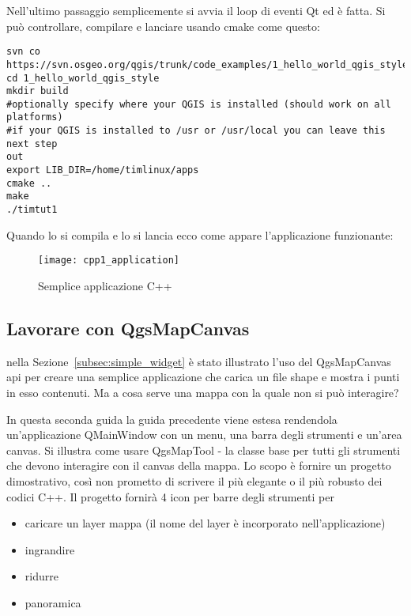 Nell'ultimo passaggio semplicemente si avvia il loop di eventi Qt ed è fatta. Si può controllare, compilare e lanciare usando cmake come questo:

\begin{verbatim}
svn co
https://svn.osgeo.org/qgis/trunk/code_examples/1_hello_world_qgis_style
cd 1_hello_world_qgis_style
mkdir build
#optionally specify where your QGIS is installed (should work on all
platforms)
#if your QGIS is installed to /usr or /usr/local you can leave this next step
out
export LIB_DIR=/home/timlinux/apps
cmake ..
make
./timtut1
\end{verbatim}

Quando lo si compila e lo si lancia ecco come appare l'applicazione funzionante:

\begin{figure}[ht]
   \begin{center}
   \caption{Semplice applicazione C++ \osxcaption}\label{fig:cpp1_application}\smallskip
   \texttt{[image: cpp1\_application]}
\end{center}
\end{figure}

\subsection{Lavorare con QgsMapCanvas}

nella Sezione~\ref{subsec:simple_widget} è stato illustrato l'uso del QgsMapCanvas api per creare una semplice applicazione che carica un file shape e mostra i punti in esso contenuti. Ma a cosa serve una mappa con la quale non si può interagire?

In questa seconda guida la guida precedente viene estesa rendendola un'applicazione QMainWindow con un menu, una barra degli strumenti e un'area canvas. Si illustra come usare QgsMapTool - la classe base per tutti gli strumenti che devono interagire con il canvas della mappa.
Lo scopo è fornire un progetto dimostrativo, così non prometto di scrivere il più elegante o il più robusto dei codici C++. Il progetto fornirà 4 icon per barre degli strumenti per

\begin{itemize}
 \item caricare un layer mappa (il nome del layer è incorporato nell'applicazione)
 \item ingrandire
 \item ridurre
 \item panoramica
\end{itemize}


